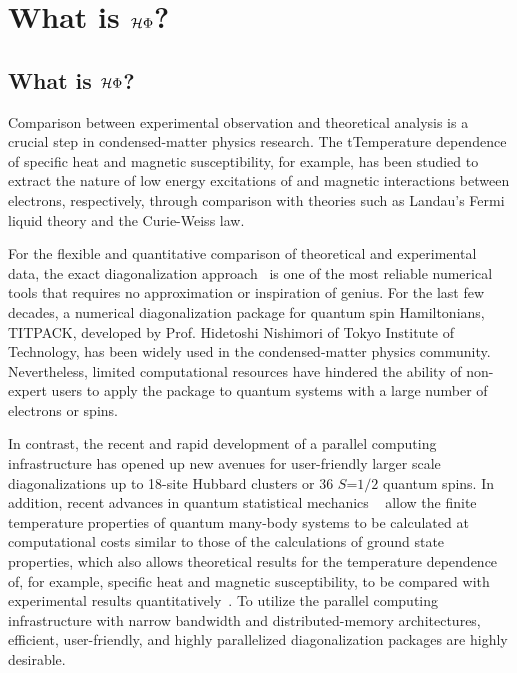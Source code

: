 \chapter{What is ${\mathcal{H} \Phi}$?}
\label{Ch:whatishphi}
\section{What is $\mathcal{H} \Phi$?}
Comparison between experimental observation and theoretical analysis is a crucial step
in condensed-matter physics research. The tTemperature dependence of specific heat and
magnetic susceptibility, for example, has been studied to extract the nature of low energy
excitations of and magnetic interactions between electrons, respectively, through comparison
with theories such as Landau's Fermi liquid theory and the Curie-Weiss law.

For the flexible and quantitative comparison of theoretical and  experimental data,
the exact diagonalization
approach~\cite{Dagotto} is one of the most reliable numerical tools that requires no approximation or
inspiration of genius. For the last few decades, a numerical diagonalization package for quantum
spin Hamiltonians, TITPACK, developed by Prof. Hidetoshi Nishimori of Tokyo Institute of Technology,
has been widely used in the condensed-matter physics community. Nevertheless, limited
computational resources have hindered the ability of non-expert users to apply the package to
quantum systems with a large number of electrons or spins.

In contrast, the recent and rapid development of a parallel computing infrastructure has opened up new
avenues for user-friendly larger scale diagonalizations up to 18-site Hubbard clusters
or 36 $S$=$1/2$ quantum spins. In addition, recent advances in quantum statistical mechanics ~\cite{Imada1986,FTLanczos,Hams,Sugiura2012}
allow the finite temperature properties of quantum many-body systems
to be calculated at computational costs similar to those of the calculations of ground state properties,
which also allows theoretical results for the temperature dependence
of, for example, specific heat and magnetic susceptibility,
to be compared with experimental results quantitatively~\cite{Yamaji2014}.
To utilize the parallel computing infrastructure with narrow bandwidth and distributed-memory
architectures, efficient, user-friendly, and highly parallelized diagonalization packages are highly desirable.

